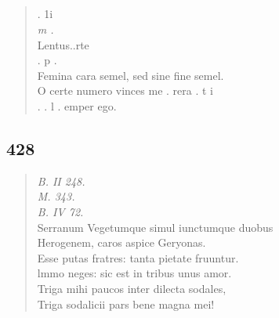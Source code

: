\documentclass[11pt, a4paper]{report}
\begin{document}
            \subsection*{}
      \begin{verse}
      . 1i \\ \textit{m .} \\ Lentus..rte \\ . p . \\ Femina cara semel, sed sine fine semel. \\ O certe numero vinces me . rera . t i \\ . . l . emper ego. \\ 
      \end{verse}
  
            \subsection*{428}
      \begin{verse}
      \textit{B. II 248.} \\ \textit{M. 343.} \\ \textit{B. IV 72.} \\ Serranum Vegetumque simul iunctumque duobus \\ Herogenem, caros aspice Geryonas. \\ Esse putas fratres: tanta pietate fruuntur. \\ lmmo neges: sic est in tribus unus amor. \\ Triga mihi paucos inter dilecta sodales, \\ Triga sodalicii pars bene magna mei! \\ 
      \end{verse}
  
\end{document}
